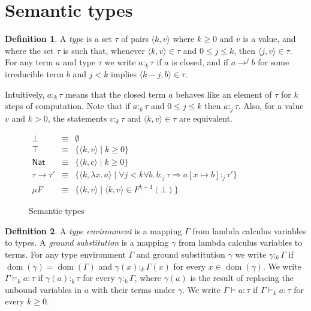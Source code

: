 \documentclass[12pt,a4paper,draft]{article}
\theoremstyle{definition}
\newtheorem{definition}{Definition}
\theoremstyle{plain}
\newcommand{\abstr}[2]{\ensuremath{\lambda{#1}.\,{#2}}}
\newcommand{\Nat}{\ensuremath{\mathsf{Nat}}}
\newcommand{\pair}[1]{\ensuremath{\langle{#1}\rangle}}
\DeclareMathOperator{\dom}{dom}
\begin{document}
\section{Semantic types}
\label{sec:Semantic_types}


\begin{definition} \label{def:Type}
  A \emph{type} is a set $\tau$ of pairs $\pair{k,v}$ where $k \ge 0$ and $v$ is a value, and where the
  set $\tau$ is such that, whenever $\pair{k,v} \in \tau$ and $0 \le j \le k$, then $\pair{j,v} \in \tau$.
  For any term $a$ and type $\tau$ we write $a :_k \tau$ if $a$ is closed, and if $a \to^j b$ for some
  irreducible term $b$ and $j < k$ implies $\pair{k-j,b} \in \tau$.
\end{definition}

Intuitively, $a :_k \tau$ means that the closed term $a$ behaves like an element of $\tau$ for $k$ steps
of computation. Note that if $a :_k \tau$ and $0 \le j \le k$ then $a :_j \tau$. Also, for a value $v$
and $k > 0$, the statements $v :_k \tau$ and $\pair{k,v} \in \tau$ are equivalent.

\begin{figure}[htb]
  \centering
  $\begin{array}{rcl}
    \bot &\equiv& \emptyset \\
    \top &\equiv& \{ \pair{k,v} \mid k \ge 0 \} \\
    \Nat &\equiv& \{ \pair{k,c} \mid k \ge 0 \} \\
    \tau \to \tau' &\equiv& \{ \pair{k,\abstr{x}{a}} \mid \forall j < k \forall b.\, b :_j \tau \Longrightarrow a[x \mapsto b] :_j \tau' \} \\
    \mu F &\equiv& \{ \pair{k,v} \mid \pair{k,v} \in F^{k+1}(\bot) \}
  \end{array}$
  \caption{Semantic types}
  \label{fig:Semantic_types}
\end{figure}

\begin{definition} \label{def:Typing}
  A \emph{type environment} is a mapping $\Gamma$ from lambda calculus variables to types. A
  \emph{ground substitution} is a mapping $\gamma$ from lambda calculus variables to terms. For
  any type environment $\Gamma$ and ground substitution $\gamma$ we write $\gamma :_k \Gamma$ if
  $\dom(\gamma) = \dom(\Gamma)$ and $\gamma(x) :_k \Gamma(x)$ for every $x \in \dom(\gamma)$. We
  write $\Gamma \models_k a : \tau$ if $\gamma(a) :_k \tau$ for every $\gamma :_k \Gamma$,
  where $\gamma(a)$ is the result of replacing the unbound variables in $a$ with their terms under
  $\gamma$. We write $\Gamma \models a : \tau$ if $\Gamma \models_k a : \tau$ for every $k \ge 0$.
\end{definition}
\end{document}
